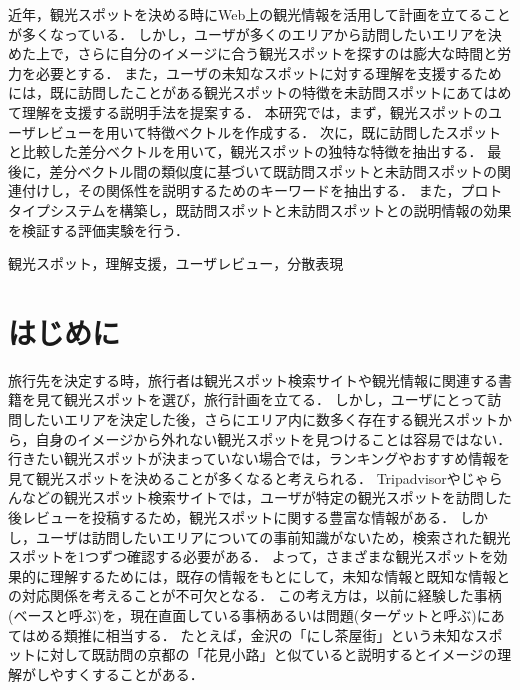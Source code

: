 \documentclass{deimj}
\begin{document}
\pagestyle{empty}
\begin{jabstract}
近年，観光スポットを決める時にWeb上の観光情報を活用して計画を立てることが多くなっている．
しかし，ユーザが多くのエリアから訪問したいエリアを決めた上で，さらに自分のイメージに合う観光スポットを探すのは膨大な時間と労力を必要とする．
また，ユーザの未知なスポットに対する理解を支援するためには，既に訪問したことがある観光スポットの特徴を未訪問スポットにあてはめて理解を支援する説明手法を提案する．
本研究では，まず，観光スポットのユーザレビューを用いて特徴ベクトルを作成する．
次に，既に訪問したスポットと比較した差分ベクトルを用いて，観光スポットの独特な特徴を抽出する．
最後に，差分ベクトル間の類似度に基づいて既訪問スポットと未訪問スポットの関連付けし，その関係性を説明するためのキーワードを抽出する．
また，プロトタイプシステムを構築し，既訪問スポットと未訪問スポットとの説明情報の効果を検証する評価実験を行う．
\end{jabstract}

\begin{jkeyword}
観光スポット，理解支援，ユーザレビュー，分散表現
\end{jkeyword}
\maketitle


\section{はじめに}
\label{sec:はじめに}
旅行先を決定する時，旅行者は観光スポット検索サイトや観光情報に関連する書籍を見て観光スポットを選び，旅行計画を立てる．
しかし，ユーザにとって訪問したいエリアを決定した後，さらにエリア内に数多く存在する観光スポットから，自身のイメージから外れない観光スポットを見つけることは容易ではない．
行きたい観光スポットが決まっていない場合では，ランキングやおすすめ情報を見て観光スポットを決めることが多くなると考えられる．
Tripadvisorやじゃらんなどの観光スポット検索サイトでは，ユーザが特定の観光スポットを訪問した後レビューを投稿するため，観光スポットに関する豊富な情報がある．
しかし，ユーザは訪問したいエリアについての事前知識がないため，検索された観光スポットを1つずつ確認する必要がある．
よって，さまざまな観光スポットを効果的に理解するためには，既存の情報をもとにして，未知な情報と既知な情報との対応関係を考えることが不可欠となる．
この考え方は，以前に経験した事柄(ベースと呼ぶ)を，現在直面している事柄あるいは問題(ターゲットと呼ぶ)にあてはめる類推に相当する．
たとえば，金沢の「にし茶屋街」という未知なスポットに対して既訪問の京都の「花見小路」と似ていると説明するとイメージの理解がしやすくすることがある．
\end{document}
